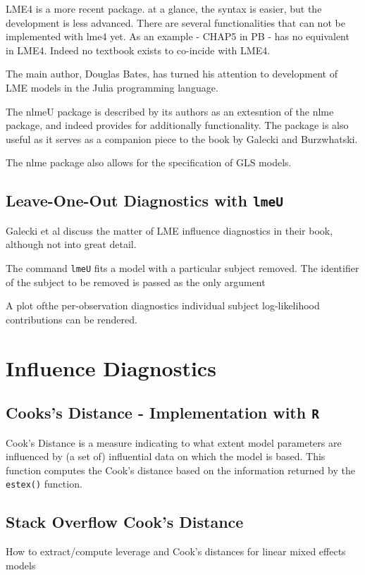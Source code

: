	LME4 is a more recent package. at a glance, the syntax is easier, but the development is less advanced. There are several functionalities that can not be implemented with lme4 yet. 
	As an example - CHAP5 in PB - has no equivalent in LME4. Indeed no textbook exists to co-incide with LME4.
	
	The main author, Douglas Bates, has turned his attention to development of LME models in the Julia programming language.
	
	The nlmeU package is described by its authors as an extesntion of the nlme package, and indeed provides for additionally functionality. The package is also useful as it serves as a companion piece to the 
	book by Galecki and Burzwhatski.
	
	The nlme package also allows for the specification of GLS models.
	
\section{Leave-One-Out Diagnostics with \texttt{lmeU}}
Galecki et al discuss the matter of LME influence diagnostics in their book, although not into great detail.


The command \texttt{lmeU} fits a model with a particular subject removed. The identifier of the subject to be removed is passed as the only argument

A plot ofthe per-observation diagnostics individual subject log-likelihood contributions can be rendered.

	
\chapter{Influence Diagnostics}	
\section{Cooks's Distance - Implementation with \texttt{R}}
Cook's Distance is a measure indicating to what extent model parameters are influenced by (a set of) influential data on which the model is based. This function computes the Cook's distance based on the information returned by the \texttt{estex()} function.


\section{Stack Overflow Cook's Distance}
How to extract/compute leverage and Cook's distances for linear mixed effects models


